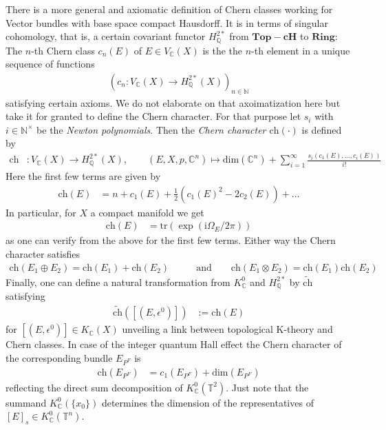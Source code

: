 \begin{rem}
\label{rem:chchar}
There is a more general and axiomatic definition of Chern classes working for Vector bundles with base space compact Hausdorff. It is in terms of singular cohomology, that is, a certain covariant functor $H_{\mathbb{Q}}^{2\ast}$ from $\mathbf{Top-cH}$ to $\mathbf{Ring}$: The $n$-th Chern class $c_{n}(E)$ of $E \in V_{\mathbb{C}}(X)$ is the the $n$-th element in a unique sequence of functions
\begin{align*}
  \left(
    c_{n}
    \colon
    V_{\mathbb{C}}(X)
    \to
    H_{\mathbb{Q}}^{2\ast}(X)
  \right)_{n\in\mathbb{N}}
\end{align*}
satisfying certain axioms. We do not elaborate on that axoimatization here but take it for granted to define the Chern character. For that purpose let $s_{i}$ with $i \in \mathbb{N}^{\times}$ be the \textit{Newton polynomials}. Then the \textit{Chern character $\mathrm{ch}(\cdot)$} is defined by
\begin{align*}
  \mathrm{ch}
  &\colon
   V_{\mathbb{C}}(X)
  \to
  H_{\mathbb{Q}}^{2\ast}(X)
  ,\qquad
  (E,X,p,\mathbb{C}^{n})
  \mapsto
  \mathrm{dim}(\mathbb{C}^{n})
  +
  \sum_{i=1}^{\infty}
  \frac{s_{i}(c_{1}(E),\ldots,c_{i}(E))}{i!}
\end{align*}
Here the first few terms are given by
\begin{align*}
  \mathrm{ch}(E)
  &=
  n
  +
  c_{1}(E)
  +
  \frac{1}{2}
  (c_{1}(E)^{2} - 2c_{2}(E))
  +
  \ldots
\end{align*}
In particular, for $X$ a compact manifold we get
\begin{align*}
  \mathrm{ch}(E)
  &=
  \mathrm{tr}(\exp(\mathrm{i}\Omega_{E}/2\pi))
\end{align*}
as one can verify from the above for the first few terms. Either way the Chern character satisfies
\begin{align*}
  \mathrm{ch}(E_{1} \oplus E_{2})
  =
  \mathrm{ch}(E_{1})
  +
  \mathrm{ch}(E_{2})
  \qquad
  &\text{and}
  \qquad
  \mathrm{ch}(E_{1} \otimes E_{2})
  =
  \mathrm{ch}(E_{1})
  \mathrm{ch}(E_{2})
\end{align*}
Finally, one can define a natural transformation from $K_{\mathbb{C}}^{0}$ and $H_{\mathbb{Q}}^{2\ast}$ by $\widetilde{\mathrm{ch}}$ satisfying
\begin{align*}
  \widetilde{\mathrm{ch}}([(E,\epsilon^{0})])
  &:=
  \mathrm{ch}(E)
\end{align*} for $[(E,\epsilon^{0})] \in K_{\mathbb{C}}(X)$ unveiling a link between topological K-theory and Chern classes. In case of the integer quantum Hall effect the Chern character of the corresponding bundle $E_{P^{F}}$ is
\begin{align*}
  \mathrm{ch}(E_{P^{F}})
  &=
  c_{1}(E_{P^{F}})
  +
  \mathrm{dim}(E_{P^{F}})
\end{align*}
reflecting the direct sum decomposition of $K_{\mathbb{C}}^{0}(\mathbb{T}^{2})$. Just note that the summand $K_{\mathbb{C}}^{0}(\lbrace x_{0} \rbrace)$ determines the dimension of the representatives of $[E]_{s} \in K_{\mathbb{C}}^{0}(\mathbb{T}^{n})$.
\end{rem}
